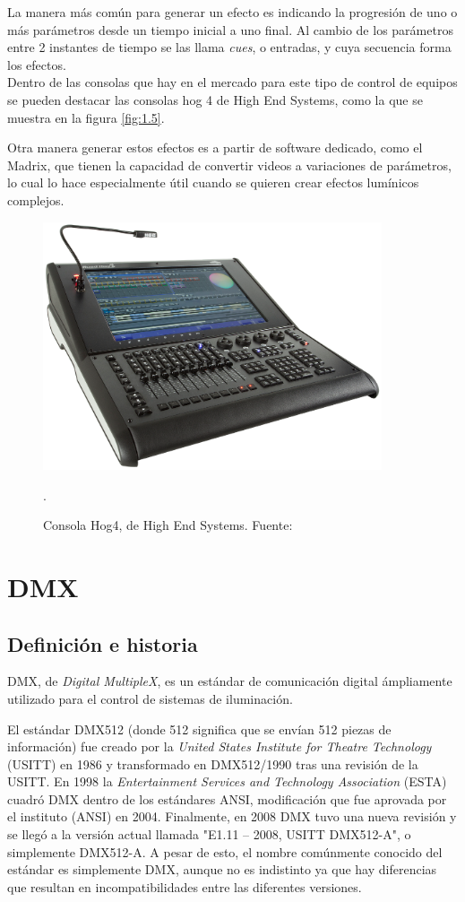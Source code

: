La manera más común para generar un efecto es indicando la progresión de uno o más parámetros desde un tiempo inicial a uno final. Al cambio de los parámetros entre 2 instantes de tiempo se las llama \textit{cues}, o entradas, y cuya secuencia forma los efectos. \\
Dentro de las consolas que hay en el mercado para este tipo de control de equipos se pueden destacar las consolas hog 4 de High End Systems, como la que se muestra en la figura \ref{fig:1.5}.

Otra manera generar estos efectos es a partir de software dedicado, como el Madrix, que tienen la capacidad de convertir videos a variaciones de parámetros, lo cual lo hace especialmente útil cuando se quieren crear efectos lumínicos complejos.


\begin{figure}[!ht]
	\centering
	\includegraphics[width=10cm,scale=1]{resources/1_5-consolaHOG.png}
	\caption{Consola Hog4, de High End Systems. Fuente: \cite{fig1_5}}.
	\label{fig:\thefigure}
\end{figure}

\newpage
\section{DMX} \label{sec:\thesection}
\subsection{Definición e historia}
DMX, de \textit{Digital MultipleX}, es un estándar de comunicación digital ámpliamente utilizado para el control de sistemas de iluminación. 

El estándar DMX512 (donde 512 significa que se envían 512 piezas de información) fue creado por la \textit{United States Institute for Theatre Technology} (USITT) en 1986 y transformado en DMX512/1990 tras una revisión de la USITT. En 1998 la \textit{Entertainment Services and Technology Association} (ESTA) cuadró DMX dentro de los estándares ANSI, modificación que fue aprovada por el instituto (ANSI) en 2004. Finalmente, en 2008 DMX tuvo una nueva revisión y se llegó a la versión actual llamada "E1.11 – 2008, USITT DMX512-A", o simplemente DMX512-A. A pesar de esto, el nombre comúnmente conocido del estándar es simplemente DMX, aunque no es indistinto ya que hay diferencias que resultan en incompatibilidades entre las diferentes versiones.


